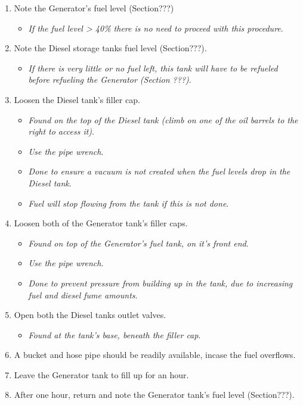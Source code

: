 \documentclass[
  letterpaper,
  DIV=11,
  numbers=noendperiod]{scrreprt}
\providecommand{\tightlist}{%
  \setlength{\itemsep}{0pt}\setlength{\parskip}{0pt}}\usepackage{longtable,booktabs,array}
\begin{document}
\begin{enumerate}
\def\labelenumi{\arabic{enumi}.}
\setcounter{enumi}{14}
\tightlist
\item
  Note the Generator's fuel level (Section???)

  \begin{itemize}
  \tightlist
  \item
    \emph{If the fuel level \textgreater{} 40\% there is no need to
    proceed with this procedure}.
  \end{itemize}
\item
  Note the Diesel storage tanks fuel level (Section???).

  \begin{itemize}
  \tightlist
  \item
    \emph{If there is very little or no fuel left, this tank will have
    to be refueled before refueling the Generator (Section ???)}.
  \end{itemize}
\item
  Loosen the Diesel tank's filler cap.

  \begin{itemize}
  \tightlist
  \item
    \emph{Found on the top of the Diesel tank (climb on one of the oil
    barrels to the right to access it)}.
  \item
    \emph{Use the pipe wrench}.
  \item
    \emph{Done to ensure a vacuum is not created when the fuel levels
    drop in the Diesel tank}.
  \item
    \emph{Fuel will stop flowing from the tank if this is not done}.
  \end{itemize}
\item
  Loosen both of the Generator tank's filler caps.

  \begin{itemize}
  \tightlist
  \item
    \emph{Found on top of the Generator's fuel tank, on it's front end}.
  \item
    \emph{Use the pipe wrench}.
  \item
    \emph{Done to prevent pressure from building up in the tank, due to
    increasing fuel and diesel fume amounts}.
  \end{itemize}
\item
  Open both the Diesel tanks outlet valves.

  \begin{itemize}
  \tightlist
  \item
    \emph{Found at the tank's base, beneath the filler cap}.
  \end{itemize}
\item
  A bucket and hose pipe should be readily available, incase the fuel
  overflows.
\item
  Leave the Generator tank to fill up for an hour.
\item
  After one hour, return and note the Generator tank's fuel level
  (Section???).


\end{enumerate}
\end{document}
